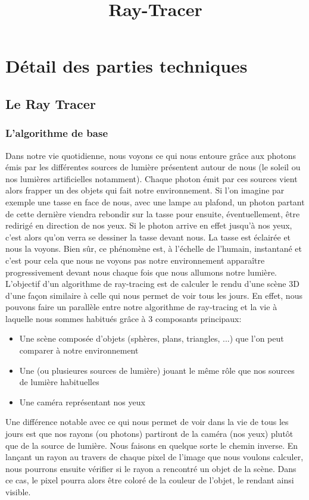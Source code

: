 \documentclass[11pt]{article}
\author{}
\title{Ray-Tracer}
\date{}
\begin{document}
\maketitle

\section{Détail des parties techniques}
\subsection{Le Ray Tracer}
\subsubsection{L'algorithme de base}
Dans notre vie quotidienne, nous voyons ce qui nous entoure grâce aux photons émis par les différentes sources de lumière présentent autour de nous (le soleil ou nos lumières artificielles notamment). Chaque photon émit par ces sources vient alors frapper un des objets qui fait notre environnement. Si l'on imagine par exemple une tasse en face de nous, avec une lampe au plafond, un photon partant de cette dernière viendra rebondir sur la tasse pour ensuite, éventuellement, être redirigé en direction de nos yeux. Si le photon arrive en effet jusqu'à nos yeux, c'est alors qu'on verra se dessiner la tasse devant nous. La tasse est éclairée et nous la voyons. Bien sûr, ce phénomène est, à l'échelle de l'humain, instantané et c'est pour cela que nous ne voyons pas notre environnement apparaître progressivement devant nous chaque fois que nous allumons notre lumière. \\
L'objectif d'un algorithme de ray-tracing est de calculer le rendu d'une scène 3D d'une façon similaire à celle qui nous permet de voir tous les jours. En effet, nous pouvons faire un parallèle entre notre algorithme de ray-tracing et la vie à laquelle nous sommes habitués grâce à 3 composants principaux:
\begin{itemize}
	\item{Une scène composée d'objets (sphères, plans, triangles, ...) que l'on peut comparer à notre environnement}
	\item{Une (ou plusieures sources de lumière) jouant le même rôle que nos sources de lumière habituelles}
	\item{Une caméra représentant nos yeux}
\end{itemize}
Une différence notable avec ce qui nous permet de voir dans la vie de tous les jours est que nos rayons (ou photons) partiront de la caméra (nos yeux) plutôt que de la source de lumière. Nous faisons en quelque sorte le chemin inverse. En lançant un rayon au travers de chaque pixel de l'image que nous voulons calculer, nous pourrons ensuite vérifier si le rayon a rencontré un objet de la scène. Dans ce cas, le pixel pourra alors être coloré de la couleur de l'objet, le rendant ainsi visible.
\end{document}
